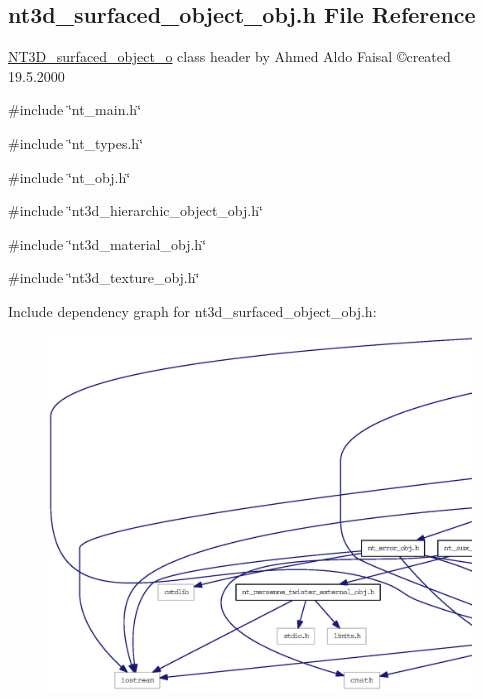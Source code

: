 \subsection{nt3d\_\-surfaced\_\-object\_\-obj.h File Reference}
\label{nt3d__surfaced__object__obj_8h}



\begin{DoxyItemize}
\item \hyperlink{class_n_t3_d__surfaced__object__o}{NT3D\_\-surfaced\_\-object\_\-o} class header by Ahmed Aldo Faisal \copyright created 19.5.2000 
\end{DoxyItemize} 


{\ttfamily \#include \char`\"{}nt\_\-main.h\char`\"{}}\par
{\ttfamily \#include \char`\"{}nt\_\-types.h\char`\"{}}\par
{\ttfamily \#include \char`\"{}nt\_\-obj.h\char`\"{}}\par
{\ttfamily \#include \char`\"{}nt3d\_\-hierarchic\_\-object\_\-obj.h\char`\"{}}\par
{\ttfamily \#include \char`\"{}nt3d\_\-material\_\-obj.h\char`\"{}}\par
{\ttfamily \#include \char`\"{}nt3d\_\-texture\_\-obj.h\char`\"{}}\par
Include dependency graph for nt3d\_\-surfaced\_\-object\_\-obj.h:
\nopagebreak
\begin{figure}[H]
\begin{center}
\leavevmode
\includegraphics[width=400pt]{nt3d__surfaced__object__obj_8h__incl}
\end{center}
\end{figure}
